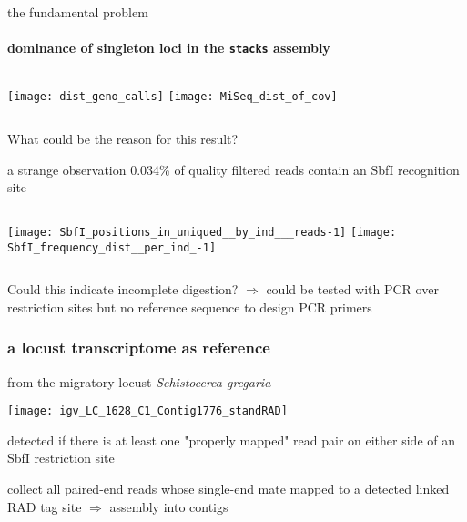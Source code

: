 \documentclass[xcolor=pdftex, dvipsnames, table]{beamer}
\begin{document}
\begin{frame}{the fundamental problem}
\framesubtitle{dominance of singleton loci in the \texttt{stacks} assembly}
\vskip25pt
\begin{columns}
\texttt{[image: dist\_geno\_calls]}
\texttt{[image: MiSeq\_dist\_of\_cov]}
\end{columns}
\vskip25pt
\begin{block}{}
\centering
What could be the reason for this result?
\end{block}
\end{frame}

\begin{frame}{a strange observation}
\centering
\footnotesize
0.034\% of quality filtered reads contain an SbfI recognition site
\vskip15pt
\begin{columns}
\texttt{[image: SbfI\_positions\_in\_uniqued\_\_by\_ind\_\_\_reads-1]}
\texttt{[image: SbfI\_frequency\_dist\_\_per\_ind\_-1]}
\end{columns}
\medskip
\pause
\begin{block}{}
\centering
Could this indicate incomplete digestion?
\pause
$\Rightarrow$ could be tested with PCR over restriction sites
but no reference sequence to design PCR primers
\end{block}
\end{frame}

\begin{frame}[shrink]
\frametitle{a locust transcriptome as reference}
\medskip
\scriptsize
from the migratory locust \textit{Schistocerca gregaria}
\medskip
\begin{center}
\texttt{[image: igv\_LC\_1628\_C1\_Contig1776\_standRAD]}
\end{center}
\pause
\begin{description}
\scriptsize
\item[linked RAD tag site] detected if there is at least one "properly mapped" read pair on either side of an SbfI restriction site
\end{description}
\pause
collect all paired-end reads whose single-end mate mapped to a detected \textrm{linked RAD tag} site
$\Rightarrow$ assembly into contigs
\end{frame}
\end{document}
